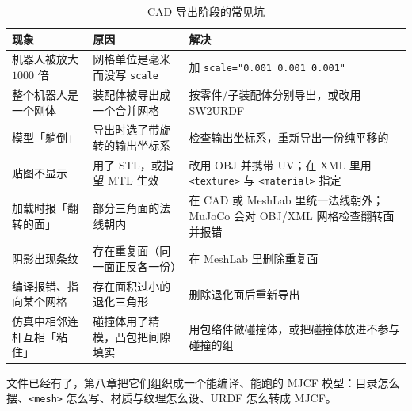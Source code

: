 \begin{table}[H]
	\centering
	\caption{CAD 导出阶段的常见坑}
	\label{tab:Cad:常见坑}
	\footnotesize
	\begin{tabular}{>{\raggedright\arraybackslash}p{3.6cm}>{\raggedright\arraybackslash}p{4.6cm}>{\raggedright\arraybackslash}p{6.2cm}}
		\hline
		现象 & 原因 & 解决 \\
		\hline
		机器人被放大 $1000$ 倍 & 网格单位是毫米而没写 \texttt{scale} & 加 \texttt{scale="0.001 0.001 0.001"} \\
		整个机器人是一个刚体 & 装配体被导出成一个合并网格 & 按零件/子装配体分别导出，或改用 SW2URDF \\
		模型「躺倒」 & 导出时选了带旋转的输出坐标系 & 检查输出坐标系，重新导出一份纯平移的 \\
		贴图不显示 & 用了 STL，或指望 MTL 生效 & 改用 OBJ 并携带 UV；在 XML 里用 \texttt{<texture>} 与 \texttt{<material>} 指定 \\
		加载时报「翻转的面」 & 部分三角面的法线朝内 & 在 CAD 或 MeshLab 里统一法线朝外；MuJoCo 会对 OBJ/XML 网格检查翻转面并报错 \\
		阴影出现条纹 & 存在重复面（同一面正反各一份） & 在 MeshLab 里删除重复面 \\
		编译报错、指向某个网格 & 存在面积过小的退化三角形 & 删除退化面后重新导出 \\
		仿真中相邻连杆互相「粘住」 & 碰撞体用了精模，凸包把间隙填实 & 用包络件做碰撞体，或把碰撞体放进不参与碰撞的组 \\
		\hline
	\end{tabular}
\end{table}

\begin{tipbox}[下一步]
	文件已经有了，第八章把它们组织成一个能编译、能跑的 MJCF 模型：目录怎么摆、\texttt{<mesh>} 怎么写、材质与纹理怎么设、URDF 怎么转成 MJCF。
\end{tipbox}
